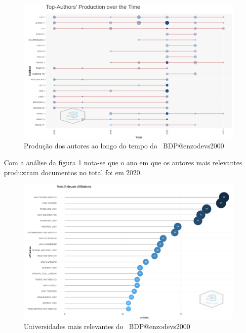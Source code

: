 \begin{figure}[H]
    \centering
    \includegraphics[width=1\textwidth]{experiments/enzodevs2000/AnaliseBibliometrica/BigDataInPolicy/Figures/Graficos/NovoDataset/Authors/author_production_overtime.png}
    \caption{Produção dos autores ao longo do tempo do
    \dataset\ BDP@enzodevs2000}
    \label{fig:enzodevs2000:BDP:newdataset:authors:author_production_overtime}
\end{figure}

Com a análise da figura \ref{fig:enzodevs2000:BDP:newdataset:authors:author_production_overtime} nota-se que o ano em que os autores mais relevantes produziram documentos no total foi em 2020.

\begin{figure}[H]
    \centering
    \includegraphics[width=1\textwidth]{experiments/enzodevs2000/AnaliseBibliometrica/BigDataInPolicy/Figures/Graficos/NovoDataset/Authors/mstrlvAffiliations.png}
    \caption{Universidades mais relevantes do
    \dataset\ BDP@enzodevs2000}
    \label{fig:enzodevs2000:BDP:newdataset:authors:most_relevants_affiliations}
\end{figure}

